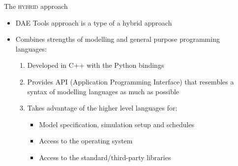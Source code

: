 \documentclass[compress,newPxFont,sthlmFooter]{beamer}
\begin{document}
\begin{frame}{The \textsc{hybrid} approach}
  \begin{itemize}
    \item DAE Tools approach is a \alert{type of a hybrid approach}
    \item Combines strengths of \alert{modelling} and \alert{general purpose} programming languages:
        \begin{enumerate}
            \item \alert{Developed in C++} with the \alert{Python bindings}
            \item Provides \alert{API} (Application Programming Interface) that \alert{resembles a syntax of modelling languages}
                  as much as possible
            \item \alert{Takes advantage of the higher level languages} for:
                \begin{itemize}
                    \item Model specification, simulation setup and schedules
                    \item Access to the operating system 
                    \item Access to the standard/third-party libraries
                \end{itemize}
        \end{enumerate}
  \end{itemize}
\end{frame}
\end{document}
